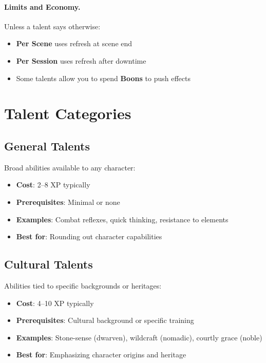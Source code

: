 \paragraph{Limits and Economy.}
Unless a talent says otherwise:
\begin{itemize}
\item \textbf{Per Scene} uses refresh at scene end
\item \textbf{Per Session} uses refresh after downtime
\item Some talents allow you to spend \textbf{Boons} to push effects
\end{itemize}

\section{Talent Categories}

\subsection*{General Talents}
Broad abilities available to any character:
\begin{itemize}
\item \textbf{Cost}: 2--8 XP typically
\item \textbf{Prerequisites}: Minimal or none
\item \textbf{Examples}: Combat reflexes, quick thinking, resistance to elements
\item \textbf{Best for}: Rounding out character capabilities
\end{itemize}

\subsection*{Cultural Talents}
Abilities tied to specific backgrounds or heritages:
\begin{itemize}
\item \textbf{Cost}: 4--10 XP typically
\item \textbf{Prerequisites}: Cultural background or specific training
\item \textbf{Examples}: Stone-sense (dwarven), wildcraft (nomadic), courtly grace (noble)
\item \textbf{Best for}: Emphasizing character origins and heritage
\end{itemize}

